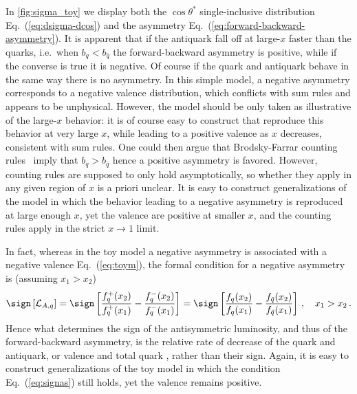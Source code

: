 In \cref{fig:sigma_toy} we display both the $\cos\theta^*$
single-inclusive distribution Eq.~(\ref{eq:dsigma-dcos}) and
the asymmetry Eq.~(\ref{eq:forward-backward-asymmetry}).
%
It is apparent that if the  antiquark \pdfs fall off at large-$x$ faster than
the quarks, i.e.\ when $b_q < b_{\bar{q}}$ the forward-backward
asymmetry is positive, while if the converse is true it is
negative. Of course if the quark and antiquark \pdfs behave in the same
way there is no asymmetry.
%
In this simple model, a negative asymmetry corresponds to a negative
valence distribution, which conflicts with sum rules and appears to be
unphysical. However, the model should be only taken as illustrative of
the large-$x$ behavior: it is of course easy to construct \pdfs that
reproduce this behavior at very large $x$, while leading to a positive
valence \pdf as $x$ decreases, consistent with sum rules. One could then argue that
Brodsky-Farrar counting rules~\cite{Brodsky:1973kr,Brodsky:1974vy}
imply that  $b_q > b_{\bar{q}}$
hence a positive asymmetry is favored.
%
However,
counting rules are supposed to only hold asymptotically, so whether
they apply in any given region of $x$ is a priori unclear.
%
It is easy
to construct generalizations of the model in which the behavior
leading to a negative asymmetry is reproduced at large enough $x$, yet
the valence \pdfs are positive at smaller $x$, and the counting rules
apply in the strict $x\to1$ limit.

In fact, whereas in the toy model a negative asymmetry is
associated with a negative valence
Eq.~(\ref{eq:toym}), the formal condition for a negative asymmetry is
(assuming $x_1>x_2$)
\begin{equation}\label{eq:signas}
   \sign\left[\mathcal{L}_{A,q}\right]=\sign\left[\frac{ f_q^+(x_2)}{
       f_q^+(x_1)}-\frac{
       f_q^-(x_2)}{f_q^-(x_1)}\right]=\sign\left[\frac{ f_q(x_2)}{
       f_q(x_1)}-\frac{f_{\bar{q}}(x_2)}{f_{\bar{q}}(x_1)}\right] \, , \quad x_1>x_2 \,.
\end{equation}
Hence what determines the sign of the antisymmetric luminosity, and thus
of the forward-backward asymmetry, is the relative rate of decrease of
the quark and antiquark, or valence and total quark \pdfs, rather than
their sign. Again, it is easy to construct generalizations of the
toy model in which the condition Eq.~(\ref{eq:signas}) still holds,  yet
the valence \pdf remains positive.

